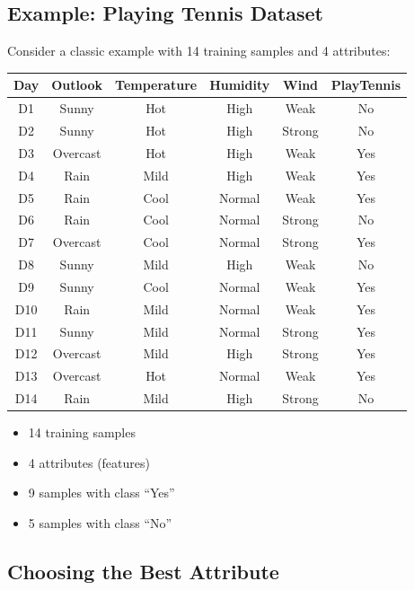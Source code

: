 \documentclass[11pt,a4paper]{article}
\theoremstyle{definition}
\theoremstyle{plain}
\theoremstyle{remark}
\begin{document}
\subsection{Example: Playing Tennis Dataset}

Consider a classic example with 14 training samples and 4 attributes:

\begin{center}
\small
\begin{tabular}{|c|c|c|c|c|c|}
\hline
\textbf{Day} & \textbf{Outlook} & \textbf{Temperature} & \textbf{Humidity} & \textbf{Wind} & \textbf{PlayTennis} \\
\hline
D1 & Sunny & Hot & High & Weak & No \\
D2 & Sunny & Hot & High & Strong & No \\
D3 & Overcast & Hot & High & Weak & Yes \\
D4 & Rain & Mild & High & Weak & Yes \\
D5 & Rain & Cool & Normal & Weak & Yes \\
D6 & Rain & Cool & Normal & Strong & No \\
D7 & Overcast & Cool & Normal & Strong & Yes \\
D8 & Sunny & Mild & High & Weak & No \\
D9 & Sunny & Cool & Normal & Weak & Yes \\
D10 & Rain & Mild & Normal & Weak & Yes \\
D11 & Sunny & Mild & Normal & Strong & Yes \\
D12 & Overcast & Mild & High & Strong & Yes \\
D13 & Overcast & Hot & Normal & Weak & Yes \\
D14 & Rain & Mild & High & Strong & No \\
\hline
\end{tabular}
\end{center}

\begin{itemize}
    \item 14 training samples
    \item 4 attributes (features)
    \item 9 samples with class ``Yes''
    \item 5 samples with class ``No''
\end{itemize}

\subsection{Choosing the Best Attribute}
\end{document}
